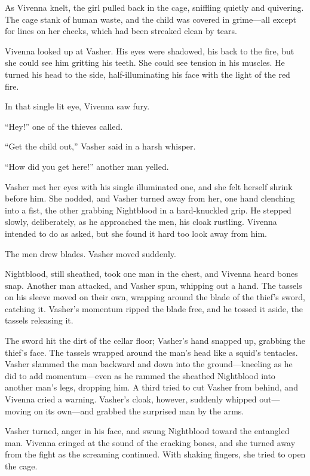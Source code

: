 As Vivenna knelt, the girl pulled back in the cage, sniffling quietly and quivering. The cage stank of human waste, and the child was covered in grime—all except for lines on her cheeks, which had been streaked clean by tears.

Vivenna looked up at Vasher. His eyes were shadowed, his back to the fire, but she could see him gritting his teeth. She could see tension in his muscles. He turned his head to the side, half-illuminating his face with the light of the red fire.

In that single lit eye, Vivenna saw fury.

“Hey!” one of the thieves called.

“Get the child out,” Vasher said in a harsh whisper.

“How did you get here!” another man yelled.

Vasher met her eyes with his single illuminated one, and she felt herself shrink before him. She nodded, and Vasher turned away from her, one hand clenching into a fist, the other grabbing Nightblood in a hard-knuckled grip. He stepped slowly, deliberately, as he approached the men, his cloak rustling. Vivenna intended to do as asked, but she found it hard too look away from him.

The men drew blades. Vasher moved suddenly.

Nightblood, still sheathed, took one man in the chest, and Vivenna heard bones snap. Another man attacked, and Vasher spun, whipping out a hand. The tassels on his sleeve moved on their own, wrapping around the blade of the thief’s sword, catching it. Vasher’s momentum ripped the blade free, and he tossed it aside, the tassels releasing it.

The sword hit the dirt of the cellar floor; Vasher’s hand snapped up, grabbing the thief’s face. The tassels wrapped around the man’s head like a squid’s tentacles. Vasher slammed the man backward and down into the ground—kneeling as he did to add momentum—even as he rammed the sheathed Nightblood into another man’s legs, dropping him. A third tried to cut Vasher from behind, and Vivenna cried a warning. Vasher’s cloak, however, suddenly whipped out—moving on its own—and grabbed the surprised man by the arms.

Vasher turned, anger in his face, and swung Nightblood toward the entangled man. Vivenna cringed at the sound of the cracking bones, and she turned away from the fight as the screaming continued. With shaking fingers, she tried to open the cage.

